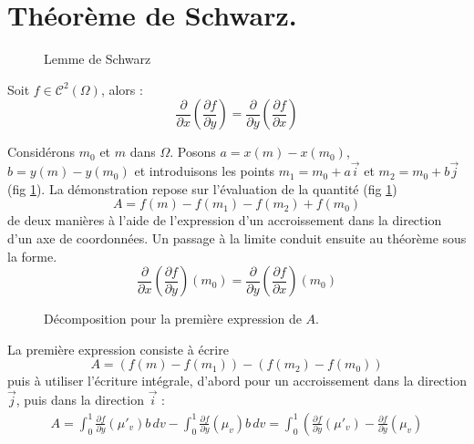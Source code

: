 \section{Théorème de Schwarz.}
\begin{figure}[ht]
 \centering
 
 \caption{Lemme de Schwarz}
 \label{fig:C6308_2}
\end{figure}
\begin{thm}
 Soit $f\in \mathcal C^2(\Omega)$, alors :
\begin{displaymath}
 \dfrac{\partial}{\partial x}\left( \dfrac{\partial f}{\partial y}\right)
=
 \dfrac{\partial}{\partial y}\left( \dfrac{\partial f}{\partial x}\right)
\end{displaymath}
\end{thm}
\begin{demo}
Considérons $m_0$ et $m$ dans $\Omega$. Posons $a=x(m)-x(m_0)$, $b=y(m)-y(m_0)$ et introduisons les points $m_1=m_0+a\overrightarrow i$ et $m_2=m_0+b\overrightarrow j$ (fig \ref{fig:C6308_2}). La démonstration repose sur l'évaluation de la quantité (fig \ref{fig:C6308_2}) 
\begin{displaymath}
A = f(m) - f(m_1) - f(m_2) + f(m_0) 
\end{displaymath}
de deux manières à l'aide de l'expression d'un accroissement dans la direction d'un axe de coordonnées. Un passage à la limite conduit ensuite au théorème sous la forme.
\begin{displaymath}
 \dfrac{\partial}{\partial x}\left( \dfrac{\partial f}{\partial y}\right)(m_0)
=
 \dfrac{\partial}{\partial y}\left( \dfrac{\partial f}{\partial x}\right)(m_0)
\end{displaymath}
\begin{figure}[ht]
 \centering
 
 \caption{Décomposition pour la première expression de $A$.}
 \label{fig:C6308_4}
\end{figure}
La première expression consiste à écrire
\begin{displaymath}
 A= \left(f(m)-f(m_1)\right)- \left(f(m_2)-f(m_0)\right) 
\end{displaymath}
puis à utiliser l'écriture intégrale, d'abord pour un accroissement dans la direction $\overrightarrow j$, puis dans la direction $\overrightarrow i$ :
\begin{multline*}
 A = \int_{0}^1\frac{\partial f}{\partial y}(\mu'_v)b\,dv 
-
\int_{0}^1\frac{\partial f}{\partial y}(\mu_v)b\,dv 
= \int_{0}^1
\left( 
\frac{\partial f}{\partial y}(\mu'_v)
-
\frac{\partial f}{\partial y}(\mu_v)

\end{multline*}
\end{demo}
